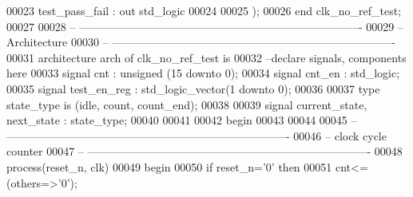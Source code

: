 \begin{DoxyCode}
00023           \textcolor{vhdlchar}{test_pass_fail}    \textcolor{vhdlchar}{:} \textcolor{keywordflow}{out} \textcolor{comment}{std\_logic}
00024      
00025         \textcolor{vhdlchar}{)};
00026 \textcolor{keywordflow}{end} \textcolor{vhdlchar}{clk\_no\_ref\_test};
00027 
00028 \textcolor{keyword}{-- ----------------------------------------------------------------------------}
00029 \textcolor{keyword}{-- Architecture}
00030 \textcolor{keyword}{-- ----------------------------------------------------------------------------}
00031 \textcolor{keywordflow}{architecture} arch \textcolor{keywordflow}{of} clk_no_ref_test is
00032 \textcolor{keyword}{--declare signals,  components here}
00033 \textcolor{keywordflow}{signal} \textcolor{vhdlchar}{cnt}          \textcolor{vhdlchar}{:} \textcolor{comment}{unsigned} \textcolor{vhdlchar}{(}\textcolor{vhdllogic}{}\textcolor{vhdllogic}{15} \textcolor{keywordflow}{downto} \textcolor{vhdllogic}{}\textcolor{vhdllogic}{0}\textcolor{vhdlchar}{)}; 
00034 \textcolor{keywordflow}{signal} \textcolor{vhdlchar}{cnt_en}       \textcolor{vhdlchar}{:} \textcolor{comment}{std\_logic};    
00035 \textcolor{keywordflow}{signal} \textcolor{vhdlchar}{test_en_reg}          \textcolor{vhdlchar}{:} \textcolor{comment}{std\_logic\_vector}\textcolor{vhdlchar}{(}\textcolor{vhdllogic}{}\textcolor{vhdllogic}{1} \textcolor{keywordflow}{downto} \textcolor{vhdllogic}{}\textcolor{vhdllogic}{0}\textcolor{vhdlchar}{)};
00036 
00037 \textcolor{keywordflow}{type} \textcolor{vhdlchar}{state_type} \textcolor{keywordflow}{is} \textcolor{vhdlchar}{(}\textcolor{vhdlchar}{idle}\textcolor{vhdlchar}{,} \textcolor{vhdlchar}{count}\textcolor{vhdlchar}{,} \textcolor{vhdlchar}{count\_end}\textcolor{vhdlchar}{)};
00038 
00039 \textcolor{keywordflow}{signal} \textcolor{vhdlchar}{current_state}\textcolor{vhdlchar}{,} \textcolor{vhdlchar}{next_state} \textcolor{vhdlchar}{:} \textcolor{vhdlchar}{state_type};
00040 
00041   
00042 \textcolor{vhdlkeyword}{begin}
00043 
00044 
00045 \textcolor{keyword}{-- ----------------------------------------------------------------------------}
00046 \textcolor{keyword}{-- clock cycle counter}
00047 \textcolor{keyword}{-- ----------------------------------------------------------------------------}
00048   \textcolor{keywordflow}{process}(reset_n, clk)
00049 \textcolor{vhdlkeyword}{    begin}
00050       \textcolor{keywordflow}{if} \textcolor{vhdlchar}{reset_n}\textcolor{vhdlchar}{=}\textcolor{vhdlchar}{'}\textcolor{vhdllogic}{}\textcolor{vhdllogic}{0}\textcolor{vhdlchar}{'} \textcolor{keywordflow}{then}
00051         \textcolor{vhdlchar}{cnt}\textcolor{vhdlchar}{<=}\textcolor{vhdlchar}{(}\textcolor{keywordflow}{others}\textcolor{vhdlchar}{=}\textcolor{vhdlchar}{>}\textcolor{vhdlchar}{'}\textcolor{vhdllogic}{}\textcolor{vhdllogic}{0}\textcolor{vhdlchar}{'}\textcolor{vhdlchar}{)}; 

\end{DoxyCode}
